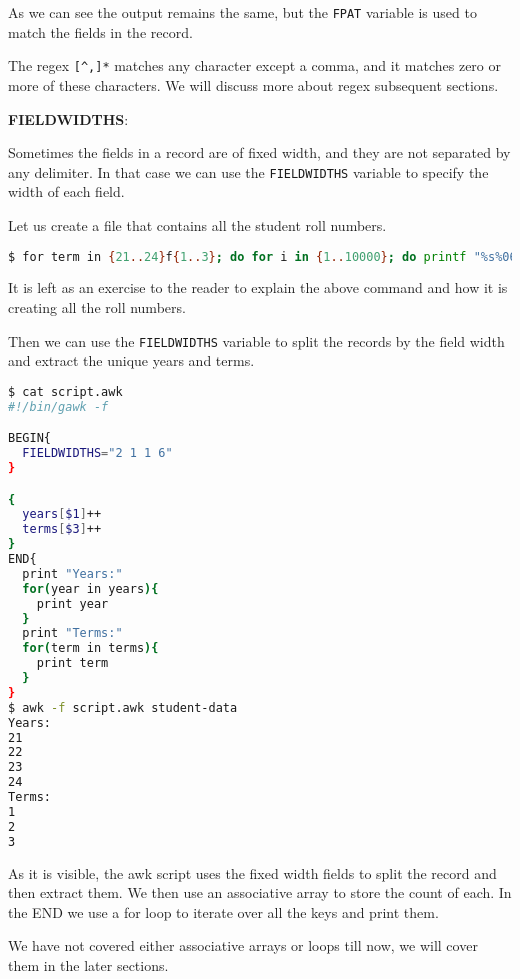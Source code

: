 As we can see the output remains the same, but the \lstinline|FPAT| variable is used to match the fields in the record.

The regex \lstinline|[^,]*| matches any character except a comma, and it matches zero or more of these characters.
We will discuss more about regex subsequent sections.

\textbf{FIELDWIDTHS}:

Sometimes the fields in a record are of fixed width, and they are not separated by any delimiter.
In that case we can use the \lstinline|FIELDWIDTHS| variable to specify the width of each field.

Let us create a file that contains all the student roll numbers.

\begin{lstlisting}[language=bash]
$ for term in {21..24}f{1..3}; do for i in {1..10000}; do printf "%s%06d\n" $term "$i" ; done ; done > student-data
\end{lstlisting}

It is left as an exercise to the reader to explain the above command and how it is creating all the roll numbers.

Then we can use the \lstinline|FIELDWIDTHS| variable to split the records by the field width and extract the unique years and terms.

\begin{lstlisting}[language=bash]
$ cat script.awk
#!/bin/gawk -f

BEGIN{
  FIELDWIDTHS="2 1 1 6"
}

{
  years[$1]++
  terms[$3]++
}
END{
  print "Years:"
  for(year in years){
    print year
  }
  print "Terms:"
  for(term in terms){
    print term
  }
}
$ awk -f script.awk student-data
Years:
21
22
23
24
Terms:
1
2
3
\end{lstlisting}

As it is visible, the awk script uses the fixed width fields to split the record and then extract them. We then use an associative array
to store the count of each. In the END we use a for loop to iterate over all the keys and print them.

We have not covered either associative arrays or loops till now, we will cover them in the later sections.

